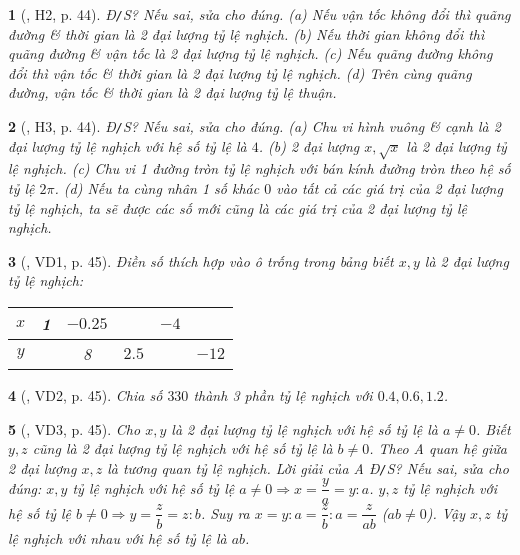 \documentclass{article}
\newtheorem{baitoan}{}
\begin{document}
\begin{baitoan}[\cite{Binh_boi_duong_Toan_7_tap_1}, H2, p. 44]
	{\rm Đ{\tt/}S?} Nếu sai, sửa cho đúng. (a) Nếu vận tốc không đổi thì quãng đường \& thời gian là 2 đại lượng tỷ lệ nghịch. (b) Nếu thời gian không đổi thì quãng đường \& vận tốc là 2 đại lượng tỷ lệ nghịch. (c) Nếu quãng đường không đổi thì vận tốc \& thời gian là 2 đại lượng tỷ lệ nghịch. (d) Trên cùng quãng đường, vận tốc \& thời gian là 2 đại lượng tỷ lệ thuận.
\end{baitoan}

\begin{baitoan}[\cite{Binh_boi_duong_Toan_7_tap_1}, H3, p. 44]
	{\rm Đ{\tt/}S?} Nếu sai, sửa cho đúng. (a) Chu vi hình vuông \& cạnh là 2 đại lượng tỷ lệ nghịch với hệ số tỷ lệ là $4$. (b) 2 đại lượng $x,\sqrt{x}$ là 2 đại lượng tỷ lệ nghịch. (c) Chu vi 1 đường tròn tỷ lệ nghịch với bán kính đường tròn theo hệ số tỷ lệ $2\pi$. (d) Nếu ta cùng nhân 1 số khác $0$ vào tất cả các giá trị của 2 đại lượng tỷ lệ nghịch, ta sẽ được các số mới cũng là các giá trị của 2 đại lượng tỷ lệ nghịch.
\end{baitoan}

\begin{baitoan}[\cite{Binh_boi_duong_Toan_7_tap_1}, VD1, p. 45]
	Điền số thích hợp vào ô trống trong bảng biết $x,y$ là 2 đại lượng tỷ lệ nghịch:
	\begin{table}[H]
		\centering
		\begin{tabular}{|c|c|c|c|c|c|}
			\hline
			$x$ & 1 & $-0.25$ &  & $-4$ &  \\
			\hline
			$y$ &  & 8 & $2.5$ &  & $-12$ \\
			\hline
		\end{tabular}
	\end{table}
\end{baitoan}

\begin{baitoan}[\cite{Binh_boi_duong_Toan_7_tap_1}, VD2, p. 45]
	Chia số $330$ thành 3 phần tỷ lệ nghịch với $0.4,0.6,1.2$.
\end{baitoan}

\begin{baitoan}[\cite{Binh_boi_duong_Toan_7_tap_1}, VD3, p. 45]
	Cho $x,y$ là 2 đại lượng tỷ lệ nghịch với hệ số tỷ lệ là $a\ne0$. Biết $y,z$ cũng là 2 đại lượng tỷ lệ nghịch với hệ số tỷ lệ là $b\ne0$. Theo A quan hệ giữa 2 đại lượng $x,z$ là tương quan tỷ lệ nghịch. Lời giải của A {\rm Đ{\tt/}S?} Nếu sai, sửa cho đúng: $x,y$ tỷ lệ nghịch với hệ số tỷ lệ $a\ne0\Rightarrow x = \dfrac{y}{a} = y:a$. $y,z$ tỷ lệ nghịch với hệ số tỷ lệ $b\ne0\Rightarrow y = \dfrac{z}{b} = z:b$. Suy ra $x = y:a = \dfrac{z}{b}:a = \dfrac{z}{ab}$ ($ab\ne0$). Vậy $x,z$ tỷ lệ nghịch với nhau với hệ số tỷ lệ là $ab$.
\end{baitoan}
\end{document}
